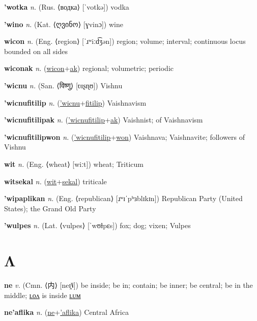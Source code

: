 \textbf{\hypertarget{'wotka}{'wotka}} \textit{n.} (Rus. ⟨водка⟩ [ˈvotkə])
vodka

\textbf{\hypertarget{'wino}{'wino}} \textit{n.} (Kat. ⟨{\georgian{}ღვინო}⟩ [ɣvinɔ])
wine

\textbf{\hypertarget{wicon}{wicon}} \textit{n.} (Eng. ⟨region⟩ [ˈɹʷiːd͡ʒən])
region; volume; interval; continuous locus bounded on all sides

\textbf{\hypertarget{wiconak}{wiconak}} \textit{n.} (\hyperlink{wicon}{wicon}+\allowbreak \hyperlink{ak}{ak})
regional; volumetric; periodic

\textbf{\hypertarget{'wicnu}{'wicnu}} \textit{n.} (San. ⟨{\devanagari{}विष्णु}⟩ [ʋɪʂɳʊ])
Vishnu

\textbf{\hypertarget{'wicnufitilip}{'wicnufitilip}} \textit{n.} (\hyperlink{'wicnu}{'wicnu}+\allowbreak \hyperlink{fitilip}{fitilip})
Vaishnavism

\textbf{\hypertarget{'wicnufitilipak}{'wicnufitilipak}} \textit{n.} (\hyperlink{'wicnufitilip}{'wicnufitilip}+\allowbreak \hyperlink{ak}{ak})
Vaishnist; of Vaishnavism

\textbf{\hypertarget{'wicnufitilipwon}{'wicnufitilipwon}} \textit{n.} (\hyperlink{'wicnufitilip}{'wicnufitilip}+\allowbreak \hyperlink{won}{won})
Vaishnava; Vaishnavite; followers of Vishnu

\textbf{\hypertarget{wit}{wit}} \textit{n.} (Eng. ⟨wheat⟩ [wiːt])
wheat; Triticum

\textbf{\hypertarget{witsekal}{witsekal}} \textit{n.} (\hyperlink{wit}{wit}+\allowbreak \hyperlink{sekal}{sekal})
triticale

\textbf{\hypertarget{'wipaplikan}{'wipaplikan}} \textit{n.} (Eng. ⟨republican⟩ [ɹʷɪˈpʰɜblɪkɪn])
Republican Party (United States); the Grand Old Party

\textbf{\hypertarget{'wulpes}{'wulpes}} \textit{n.} (Lat. ⟨vulpes⟩ [ˈwʊɫpɛs])
fox; dog; vixen; Vulpes

\section{Λ}

\textbf{\hypertarget{ne}{ne}} \textit{v.} (Cmn. ⟨{\chinese{}内}⟩ [neɪ̯˥˩])
be inside; be in; contain; be inner; be central; be in the middle; \hyperlink{nelon}{ʟᴏᴧ} is inside \hyperlink{nelum}{ʟᴜᴍ}

\textbf{\hypertarget{ne'aflika}{ne'aflika}} \textit{n.} (\hyperlink{ne}{ne}+\allowbreak \hyperlink{'aflika}{'aflika})
Central Africa

